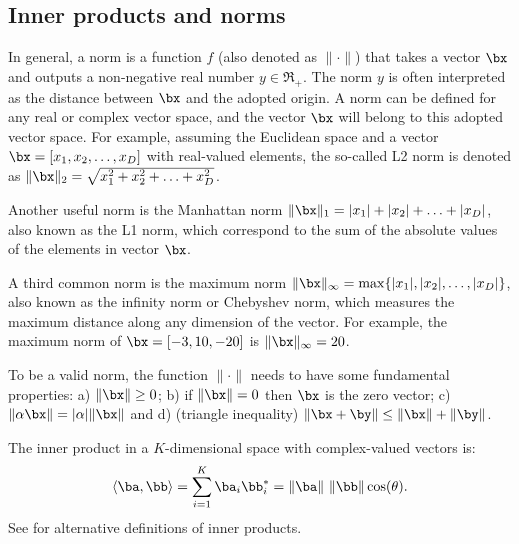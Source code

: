 

\subsection{Inner products and norms}

In general, a norm is a function $f$ (also denoted as $\| \cdot \|$) that takes a vector $\bx$ and outputs a non-negative real number $y \in \Re_{+}$.
The norm $y$ is often interpreted as the distance between $\bx$ and the adopted origin. 
A norm can be defined for any real or complex vector space, and the vector $\bx$ will belong to this adopted vector space.
For example, assuming the Euclidean space and a vector $\bx = [x_1, x_2, \ldots, x_D]$ with real-valued elements, the so-called L2 norm is denoted as $\| \bx \|_2 = \sqrt{x_1^2 + x_2^2 + \ldots + x_D^2}$.

Another useful norm is the Manhattan norm $\| \bx \|_1 = |x_1| + |x_2| + \ldots + |x_D|$, also known as the L1 norm, which 
correspond to the sum of the absolute values of the elements in vector $\bx$.

A third common norm is the maximum norm $\| \bx \|_{\infty} = \max \{ |x_1|,|x_2|, \ldots, |x_D|\}$, also known as the infinity norm or Chebyshev norm, which measures the maximum distance along any dimension of the vector.
For example, the maximum norm of $\bx = [-3, 10, -20]$ is $\| \bx \|_{\infty}=20$. 

To be a valid norm, the function $\| \cdot \|$ needs to have some fundamental properties: a) $\| \bx \| \ge 0$; b) if $\| \bx \| = 0$ then $\bx$ is the zero vector; c) $\| \alpha \bx \| = |\alpha| \| \bx \|$ and d) (triangle inequality) $\| \bx + \by \| \le \| \bx \| + \| \by \|$.

The inner product in a $K$-dimensional space with complex-valued vectors is:
\begin{equation}
\langle\ba, \bb\rangle = \sum_{i=1}^K \ba_i \bb_i^* = \lVert\ba\rVert\textrm{~} \lVert\bb\rVert \cos(\theta).
\label{eq:innerProductComplexVectors}
\end{equation}
See  for alternative definitions of inner products.

